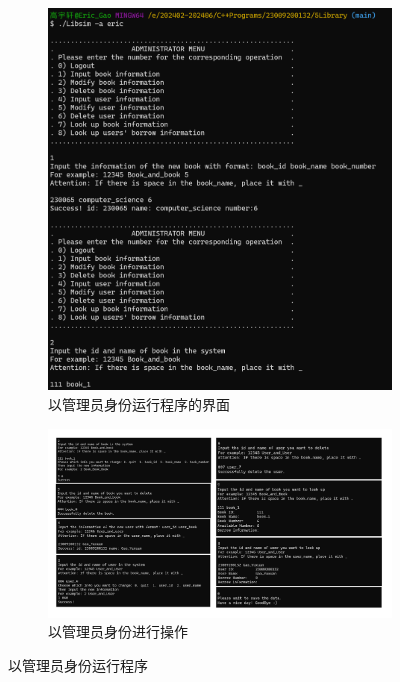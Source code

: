 \documentclass{ctexart}
\begin{document}
    \begin{figure}[!htbp]
        \centering
        \begin{subfigure}{0.34\textwidth}
            \includegraphics[width=\linewidth]{src/admin01.png}
            \caption{以管理员身份运行程序的界面}
        \end{subfigure}
        \begin{subfigure}{0.64\textwidth}
            \includegraphics[width=\linewidth]{src/admin00.png}
            \caption{以管理员身份进行操作}
        \end{subfigure}
        \caption{以管理员身份运行程序}
    \end{figure}
    
\end{document}
